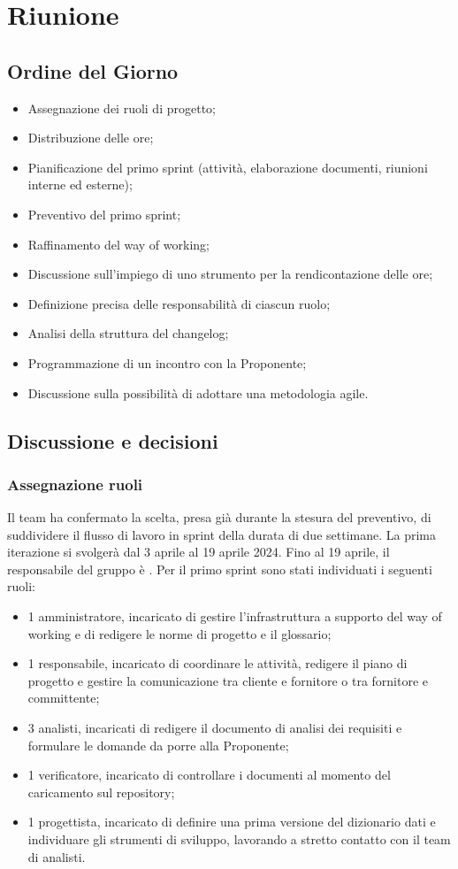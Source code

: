 \section{Riunione}
\subsection{Ordine del Giorno}
\begin{itemize}
	\item Assegnazione dei ruoli di progetto;
	\item Distribuzione delle ore;
	\item Pianificazione del primo sprint (attività, elaborazione documenti, riunioni interne ed esterne);
	\item Preventivo del primo sprint;
	\item Raffinamento del way of working;
	\item Discussione sull'impiego di uno strumento per la rendicontazione delle ore;
	\item Definizione precisa delle responsabilità di ciascun ruolo;
	\item Analisi della struttura del changelog;
	\item Programmazione di un incontro con la Proponente;
	\item Discussione sulla possibilità di adottare una metodologia agile.
\end{itemize}

\subsection{Discussione e decisioni}

\subsubsection{Assegnazione ruoli}
Il team ha confermato la scelta, presa già durante la stesura del preventivo, di suddividere il flusso di lavoro in sprint della durata di due settimane. La prima iterazione si svolgerà dal 3 aprile al 19 aprile 2024. Fino al 19 aprile, il responsabile del gruppo è \riccardo. Per il primo sprint sono stati individuati i seguenti ruoli:
\begin{itemize}
	\item 1 amministratore, incaricato di gestire l'infrastruttura a supporto del way of working e di redigere le norme di progetto e il glossario;
	\item 1 responsabile, incaricato di coordinare le attività, redigere il piano di progetto e gestire la comunicazione tra cliente e fornitore o tra fornitore e committente;
	\item 3 analisti, incaricati di redigere il documento di analisi dei requisiti e formulare le domande da porre alla Proponente;
	\item 1 verificatore, incaricato di controllare i documenti al momento del caricamento sul repository;
	\item 1 progettista, incaricato di definire una prima versione del dizionario dati e individuare gli strumenti di sviluppo, lavorando a stretto contatto con il team di analisti.
\end{itemize}

